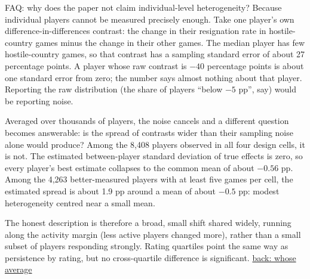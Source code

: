 \documentclass[aspectratio=169,11pt,t]{beamer}
\newcommand{\backto}[2]{\vfill\hfill\hyperlink{#1}{\textcolor{linkblue}{\scriptsize\textsf{back: #2}}}}
\begin{document}
\begin{frame}[label=faq-heterogeneity]{FAQ: why does the paper not claim individual-level heterogeneity?}
  \footnotesize
  Because individual players cannot be measured precisely enough. Take one player's own difference-in-differences contrast: the change in their resignation rate in hostile-country games minus the change in their other games. The median player has few hostile-country games, so that contrast has a sampling standard error of about 27 percentage points. A player whose raw contrast is $-40$ percentage points is about one standard error from zero; the number says almost nothing about that player. Reporting the raw distribution (the share of players ``below $-5$ pp'', say) would be reporting noise.

  Averaged over thousands of players, the noise cancels and a different question becomes answerable: is the spread of contrasts wider than their sampling noise alone would produce? Among the 8,408 players observed in all four design cells, it is not. The estimated between-player standard deviation of true effects is zero, so every player's best estimate collapses to the common mean of about $-0.56$ pp. Among the 4,263 better-measured players with at least five games per cell, the estimated spread is about 1.9 pp around a mean of about $-0.5$ pp: modest heterogeneity centred near a small mean.

  The honest description is therefore a broad, small shift shared widely, running along the activity margin (less active players changed more), rather than a small subset of players responding strongly. Rating quartiles point the same way as persistence by rating, but no cross-quartile difference is significant.
  \backto{whoseaverage}{whose average}
\end{frame}
\end{document}

